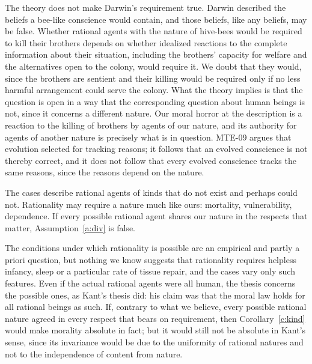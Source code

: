 \documentclass{situationist-preprint}
\begin{document}
\begin{reply}
The theory does not make Darwin's requirement true. Darwin described the beliefs a bee-like conscience would contain, and those beliefs, like any beliefs, may be false. Whether rational agents with the nature of hive-bees would be required to kill their brothers depends on whether idealized reactions to the complete information about their situation, including the brothers' capacity for welfare and the alternatives open to the colony, would require it. We doubt that they would, since the brothers are sentient and their killing would be required only if no less harmful arrangement could serve the colony. What the theory implies is that the question is open in a way that the corresponding question about human beings is not, since it concerns a different nature. Our moral horror at the description is a reaction to the killing of brothers by agents of our nature, and its authority for agents of another nature is precisely what is in question. MTE-09 argues that evolution selected for tracking reasons; it follows that an evolved conscience is not thereby correct, and it does not follow that every evolved conscience tracks the same reasons, since the reasons depend on the nature.
\end{reply}

\begin{objection}
The cases describe rational agents of kinds that do not exist and perhaps could not. Rationality may require a nature much like ours: mortality, vulnerability, dependence. If every possible rational agent shares our nature in the respects that matter, Assumption~\ref{a:div} is false.
\end{objection}

\begin{reply}
The conditions under which rationality is possible are an empirical and partly a priori question, but nothing we know suggests that rationality requires helpless infancy, sleep or a particular rate of tissue repair, and the cases vary only such features. Even if the actual rational agents were all human, the thesis concerns the possible ones, as Kant's thesis did: his claim was that the moral law holds for all rational beings as such. If, contrary to what we believe, every possible rational nature agreed in every respect that bears on requirement, then Corollary~\ref{c:kind} would make morality absolute in fact; but it would still not be absolute in Kant's sense, since its invariance would be due to the uniformity of rational natures and not to the independence of content from nature.
\end{reply}
\end{document}
